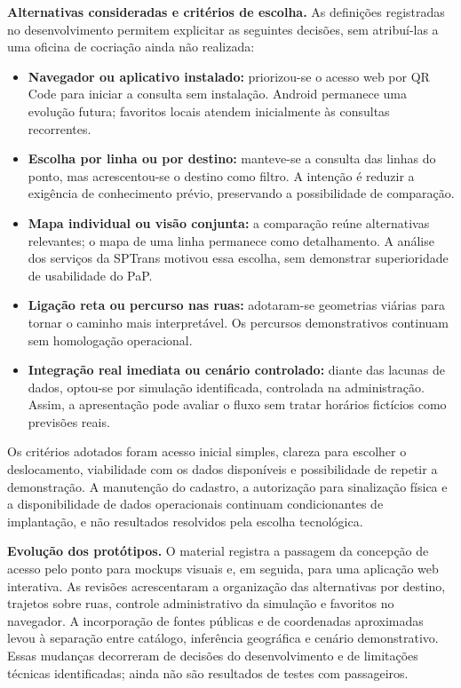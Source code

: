 \documentclass[12pt,oneside,a4paper,brazil]{abntex2}
\begin{document}
\textbf{Alternativas consideradas e critérios de escolha.} As definições registradas no desenvolvimento permitem explicitar as seguintes decisões, sem atribuí-las a uma oficina de cocriação ainda não realizada:
\begin{itemize}
\item \textbf{Navegador ou aplicativo instalado:} priorizou-se o acesso web por QR Code para iniciar a consulta sem instalação. Android permanece uma evolução futura; favoritos locais atendem inicialmente às consultas recorrentes.
\item \textbf{Escolha por linha ou por destino:} manteve-se a consulta das linhas do ponto, mas acrescentou-se o destino como filtro. A intenção é reduzir a exigência de conhecimento prévio, preservando a possibilidade de comparação.
\item \textbf{Mapa individual ou visão conjunta:} a comparação reúne alternativas relevantes; o mapa de uma linha permanece como detalhamento. A análise dos serviços da SPTrans motivou essa escolha, sem demonstrar superioridade de usabilidade do PaP.
\item \textbf{Ligação reta ou percurso nas ruas:} adotaram-se geometrias viárias para tornar o caminho mais interpretável. Os percursos demonstrativos continuam sem homologação operacional.
\item \textbf{Integração real imediata ou cenário controlado:} diante das lacunas de dados, optou-se por simulação identificada, controlada na administração. Assim, a apresentação pode avaliar o fluxo sem tratar horários fictícios como previsões reais.
\end{itemize}

Os critérios adotados foram acesso inicial simples, clareza para escolher o deslocamento, viabilidade com os dados disponíveis e possibilidade de repetir a demonstração. A manutenção do cadastro, a autorização para sinalização física e a disponibilidade de dados operacionais continuam condicionantes de implantação, e não resultados resolvidos pela escolha tecnológica.

\textbf{Evolução dos protótipos.} O material registra a passagem da concepção de acesso pelo ponto para mockups visuais e, em seguida, para uma aplicação web interativa. As revisões acrescentaram a organização das alternativas por destino, trajetos sobre ruas, controle administrativo da simulação e favoritos no navegador. A incorporação de fontes públicas e de coordenadas aproximadas levou à separação entre catálogo, inferência geográfica e cenário demonstrativo. Essas mudanças decorreram de decisões do desenvolvimento e de limitações técnicas identificadas; ainda não são resultados de testes com passageiros.
\end{document}
